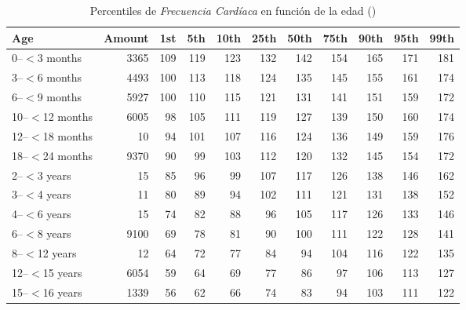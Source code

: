 \newpage
\thispagestyle{empty}
\begin{landscape}
    \begin{table}[htbp]
        \centering
        \begin{tabular}{|l|r|r|r|r|r|r|r|r|r|r|}
            \toprule
            Age & {Amount} & {1st} & {5th} & {10th} & {25th} & {50th} & {75th} & {90th} & {95th} & {99th} \\
            \midrule
            0--$<$3 months & 3365 & 109 & 119 & 123 & 132 & 142 & 154 & 165 & 171 & 181 \\
            3--$<$6 months & 4493 & 100 & 113 & 118 & 124 & 135 & 145 & 155 & 161 & 174 \\
            6--$<$9 months & 5927 & 100 & 110 & 115 & 121 & 131 & 141 & 151 & 159 & 172 \\
            10--$<$12 months & 6005 & 98 & 105 & 111 & 119 & 127 & 139 & 150 & 160 & 174 \\
            12--$<$18 months & 10 & 94 & 101 & 107 & 116 & 124 & 136 & 149 & 159 & 176 \\
            18--$<$24 months & 9370 & 90 & 99 & 103 & 112 & 120 & 132 & 145 & 154 & 172 \\
            2--$<$3 years & 15 & 85 & 96 & 99 & 107 & 117 & 126 & 138 & 146 & 162 \\
            3--$<$4 years & 11 & 80 & 89 & 94 & 102 & 111 & 121 & 131 & 138 & 152 \\
            4--$<$6 years & 15 & 74 & 82 & 88 & 96 & 105 & 117 & 126 & 133 & 146 \\
            6--$<$8 years & 9100 & 69 & 78 & 81 & 90 & 100 & 111 & 122 & 128 & 141 \\
            8--$<$12 years & 12 & 64 & 72 & 77 & 84 & 94 & 104 & 116 & 122 & 135 \\
            12--$<$15 years & 6054 & 59 & 64 & 69 & 77 & 86 & 97 & 106 & 113 & 127 \\
            15--$<$16 years & 1339 & 56 & 62 & 66 & 74 & 83 & 94 & 103 & 111 & 122 \\
            \bottomrule
        \end{tabular}
        \caption{Percentiles de \textit{Frecuencia Cardíaca} en función de la edad (\cite{percentilesFenton2015})}
        \label{tabla:age_percentiles}
    \end{table}
\end{landscape}
\restoregeometry 

